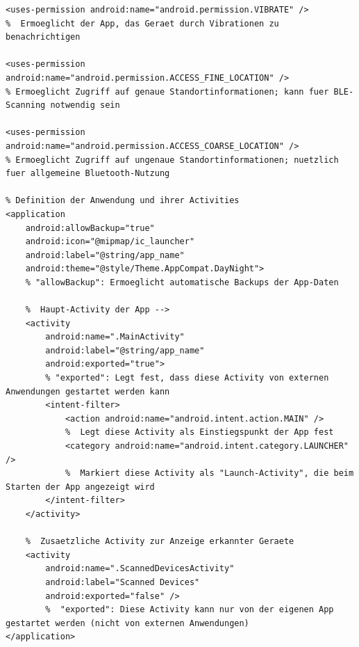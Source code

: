 \documentclass[a4paper, 12pt]{article} %
\begin{document}
\begin{spacing}{1.8}
\begin{lstlisting}
<uses-permission android:name="android.permission.VIBRATE" />
%  Ermoeglicht der App, das Geraet durch Vibrationen zu benachrichtigen 

<uses-permission android:name="android.permission.ACCESS_FINE_LOCATION" />
% Ermoeglicht Zugriff auf genaue Standortinformationen; kann fuer BLE-Scanning notwendig sein 

<uses-permission android:name="android.permission.ACCESS_COARSE_LOCATION" />
% Ermoeglicht Zugriff auf ungenaue Standortinformationen; nuetzlich fuer allgemeine Bluetooth-Nutzung 

% Definition der Anwendung und ihrer Activities 
<application
    android:allowBackup="true"
    android:icon="@mipmap/ic_launcher"
    android:label="@string/app_name"
    android:theme="@style/Theme.AppCompat.DayNight">
    % "allowBackup": Ermoeglicht automatische Backups der App-Daten 

    %  Haupt-Activity der App -->
    <activity
        android:name=".MainActivity"
        android:label="@string/app_name"
        android:exported="true">
        % "exported": Legt fest, dass diese Activity von externen Anwendungen gestartet werden kann 
        <intent-filter>
            <action android:name="android.intent.action.MAIN" />
            %  Legt diese Activity als Einstiegspunkt der App fest 
            <category android:name="android.intent.category.LAUNCHER" />
            %  Markiert diese Activity als "Launch-Activity", die beim Starten der App angezeigt wird 
        </intent-filter>
    </activity>

    %  Zusaetzliche Activity zur Anzeige erkannter Geraete 
    <activity
        android:name=".ScannedDevicesActivity"
        android:label="Scanned Devices"
        android:exported="false" />
        %  "exported": Diese Activity kann nur von der eigenen App gestartet werden (nicht von externen Anwendungen) 
</application>

    \end{lstlisting}


\end{spacing}
\end{document}
